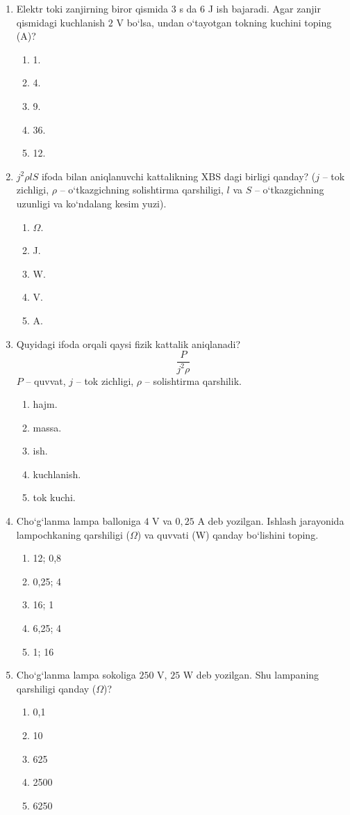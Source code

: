 \begin{enumerate}
\item Elektr toki zanjirning biror qismida $3$ s da $6$ J ish bajaradi. Agar zanjir qismidagi kuchlanish $2$ V bo‘lsa, undan o‘tayotgan tokning kuchini toping (A)?
\begin{enumerate}[label=\Alph*)]
\item 1.
\item 4.
\item 9.
\item 36.
\item 12.
\end{enumerate}

\item $j^2\rho lS$ ifoda bilan aniqlanuvchi kattalikning XBS dagi birligi qanday? ($j$ -- tok zichligi, $\rho$ -- o‘tkazgichning solishtirma qarshiligi, $l$ va $S$ -- o‘tkazgichning uzunligi va ko‘ndalang kesim yuzi).
\begin{enumerate}[label=\Alph*)]
\item $\Omega$.
\item J.
\item W.
\item V.
\item A.
\end{enumerate}

\item Quyidagi ifoda orqali qaysi fizik kattalik aniqlanadi?
\[
\frac{P}{j^2\rho}
\]
$P$ -- quvvat, $j$ -- tok zichligi, $\rho$ -- solishtirma qarshilik.
\begin{enumerate}[label=\Alph*)]
\item hajm.
\item massa.
\item ish.
\item kuchlanish.
\item tok kuchi.
\end{enumerate}

\item Cho‘g‘lanma lampa balloniga $4$ V va $0,25$ A deb yozilgan. Ishlash jarayonida lampochkaning qarshiligi ($\Omega$) va quvvati (W) qanday bo‘lishini toping.
\begin{enumerate}[label=\Alph*)]
\item 12; 0,8
\item 0,25; 4
\item 16; 1
\item 6,25; 4
\item 1; 16
\end{enumerate}

\item Cho‘g‘lanma lampa sokoliga $250$ V, $25$ W deb yozilgan. Shu lampaning qarshiligi qanday ($\Omega$)?
\begin{enumerate}[label=\Alph*)]
\item 0,1
\item 10
\item 625
\item 2500
\item 6250
\end{enumerate}


\end{enumerate}
